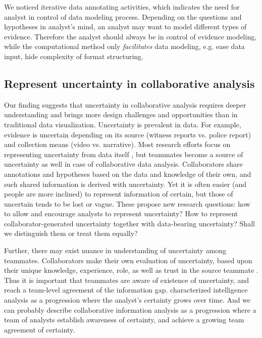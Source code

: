 We noticed iterative data annotating activities, which indicates the need for analyst in control of data modeling process.
Depending on the questions and hypotheses in analyst's mind, an analyst may want to model different types of evidence. Therefore the analyst should always be in control of evidence modeling, while the computational method only \emph{facilitates} data modeling, e.g. ease data input, hide complexity of format structuring. 



\subsection{Represent uncertainty in collaborative analysis }

Our finding suggests that uncertainty in collaborative analysis requires deeper understanding and brings more design challenges and opportunities than in traditional data visualization. Uncertainty is prevalent in data. For example, evidence is uncertain depending on its source (witness reports vs. police report) and collection means (video vs. narrative). Most research efforts focus on representing uncertainty from data itself \citep{Pang1997,Zuk2008}, but teammates become a source of uncertainty as well in case of collaborative data analysis.  Collaborators share annotations and hypotheses based on the data and knowledge of their own, and such shared information is derived with uncertainty. 
Yet it is often easier (and people are more inclined) to represent information of certain, but those of uncertain tends to be lost or vague. These propose new research questions: how to allow and encourage analysts to represent uncertainty? How to represent collaborator-generated uncertainty together with data-bearing uncertainty? Shall we distinguish them or treat them equally? 

Further, there may exist nuance in understanding of uncertainty among teammates. Collaborators make their own evaluation of uncertainty, based upon their unique knowledge, experience, role, as well as trust in the source teammate \citep{Chin2009}. Thus it is important that teammates are aware of existence of uncertainty, and reach a team-level agreement of the information gap. \cite{Graves2000} characterized intelligence analysis as a progression where the analyst's certainty grows over time. And we can probably describe collaborative information analysis as a progression where a team of analysts establish awareness of certainty, and achieve a growing team agreement of certainty. 

